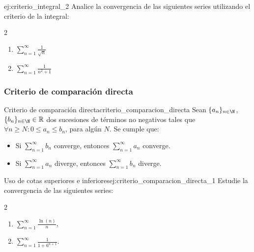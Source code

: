 \begin{problem}{}{ej:criterio_integral_2}
    Analice la convergencia de las siguientes series utilizando el criterio de la integral:
    \begin{multicols}{2}
        \begin{enumerate}
            \item $\displaystyle \sum_{n=1}^{\infty}\frac{1}{\sqrt{n}}$
            \item $\displaystyle \sum_{n=1}^{\infty}\frac{1}{n^{2}+1}$
        \end{enumerate}
    \end{multicols}
\end{problem}

\subsubsection{Criterio de comparación directa}

\begin{theorem}{Criterio de comparación directa}{criterio_comparacion_directa}
    Sean $\{ a_{n} \}_{n \in \N}$, $\{ b_{n} \}_{n \in \N}\in \mathbb{R}$ dos sucesiones de términos no negativos tales que $\forall n \ge N : 0 \le a_{n} \le b_{n}$, para algún $N$. Se cumple que:
    \begin{itemize}
        \item Si $\displaystyle \sum_{n=1}^{\infty}b_{n}$ converge, entonces $\displaystyle \sum_{n=1}^{\infty}a_{n}$ converge.
        \item Si $\displaystyle \sum_{n=1}^{\infty}a_{n}$ diverge, entonces $\displaystyle \sum_{n=1}^{\infty}b_{n}$ diverge.
    \end{itemize}
\end{theorem}

\begin{example}{Uso de cotas superiores e inferiores}{ej:criterio_comparacion_directa_1}
    Estudie la convergencia de las siguientes series:
    \begin{multicols}{2}
    \begin{enumerate}
        \item $\displaystyle \sum_{n=1}^{\infty}\frac{\ln(n)}{n}$,
        \item $\displaystyle \sum_{n=1}^{\infty}\frac{1}{1+6^{n+1}}$.
    \end{enumerate}
    \end{multicols}
\end{example}

